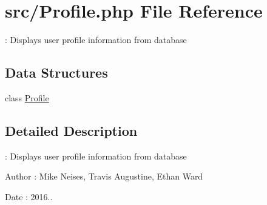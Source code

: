 \hypertarget{_profile_8php}{}\section{src/\+Profile.php File Reference}
\label{_profile_8php}


\+: Displays user profile information from database  


\subsection*{Data Structures}
\begin{DoxyCompactItemize}
\item 
class \hyperlink{class_profile}{Profile}
\end{DoxyCompactItemize}


\subsection{Detailed Description}
\+: Displays user profile information from database 

\begin{DoxyAuthor}{Author}
\+: Mike Neises, Travis Augustine, Ethan Ward 
\end{DoxyAuthor}
\begin{DoxyDate}{Date}
\+: 2016.. 
\end{DoxyDate}
